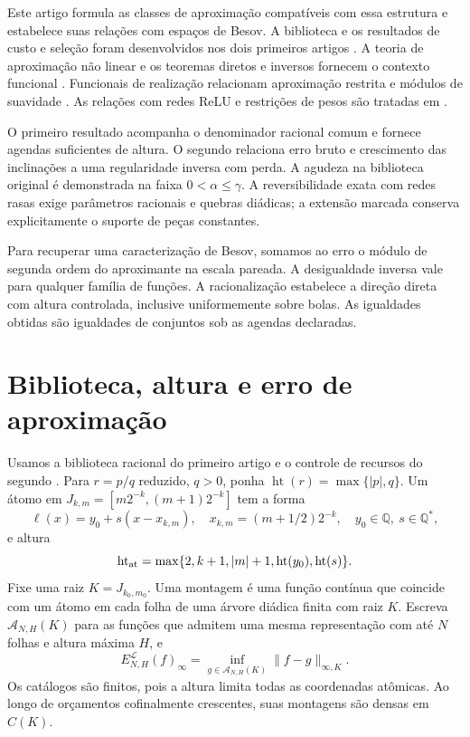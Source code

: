 \documentclass[11pt,a4paper]{article}
\theoremstyle{definition}
\theoremstyle{remark}
\newcommand{\Qstar}{\mathbb{Q}^{\!*}}
\newcommand{\Aclass}{\mathcal{A}}
\newcommand{\Library}{\mathcal{L}}
\newcommand{\height}{\operatorname{ht}}
\begin{document}
Este artigo formula as classes de aproximação compatíveis com essa estrutura e estabelece suas relações com espaços de Besov. A biblioteca e os resultados de custo e seleção foram desenvolvidos nos dois primeiros artigos \citep{oliveiraI,oliveiraII}. A teoria de aproximação não linear e os teoremas diretos e inversos fornecem o contexto funcional \citep{devore1998,devorepopov1988,petrushev1988,devorelorentz1993}. Funcionais de realização relacionam aproximação restrita e módulos de suavidade \citep{hristovivanov1990}. As relações com redes ReLU e restrições de pesos são tratadas em \citet{devorehaninpetrova2021,daubechies2022,gribonval2022,grohs2023,guhringraslan2021}.

O primeiro resultado acompanha o denominador racional comum e fornece agendas suficientes de altura. O segundo relaciona erro bruto e crescimento das inclinações a uma regularidade inversa com perda. A agudeza na biblioteca original é demonstrada na faixa $0<\alpha\le\gamma$. A reversibilidade exata com redes rasas exige parâmetros racionais e quebras diádicas; a extensão marcada conserva explicitamente o suporte de peças constantes.

Para recuperar uma caracterização de Besov, somamos ao erro o módulo de segunda ordem do aproximante na escala pareada. A desigualdade inversa vale para qualquer família de funções. A racionalização estabelece a direção direta com altura controlada, inclusive uniformemente sobre bolas. As igualdades obtidas são igualdades de conjuntos sob as agendas declaradas.

\section{Biblioteca, altura e erro de aproximação}
\label{sec:baseIII}
Usamos a biblioteca racional do primeiro artigo \citep{oliveiraI} e o controle de recursos do segundo \citep{oliveiraII}. Para $r=p/q$ reduzido, $q>0$, ponha $\height(r)=\max\{|p|,q\}$. Um átomo em $J_{k,m}=[m2^{-k},(m+1)2^{-k}]$ tem a forma
\begin{equation}
 \ell(x)=y_0+s(x-x_{k,m}),\quad x_{k,m}=(m+1/2)2^{-k},\quad y_0\in\mathbb Q,\ s\in\Qstar,
 \label{eq:inherited-atom}
\end{equation}
e altura
\begin{equation}
 \height_{\rm at}=\max\{2,k+1,|m|+1,\height(y_0),\height(s)\}.
 \label{eq:inherited-height}
\end{equation}
Fixe uma raiz $K=J_{k_0,m_0}$. Uma montagem é uma função contínua que coincide com um átomo em cada folha de uma árvore diádica finita com raiz $K$. Escreva $\Aclass_{N,H}(K)$ para as funções que admitem uma mesma representação com até $N$ folhas e altura máxima $H$, e
\[
 E_{N,H}^{\Library}(f)_\infty=\inf_{g\in\Aclass_{N,H}(K)}\|f-g\|_{\infty,K}.
\]
Os catálogos são finitos, pois a altura limita todas as coordenadas atômicas. Ao longo de orçamentos cofinalmente crescentes, suas montagens são densas em $C(K)$.
\end{document}
